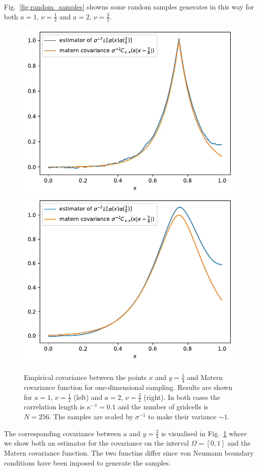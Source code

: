 \documentclass[11pt]{article}
\begin{document}
Fig.~\ref{fig:random_samples} showns some random samples generates in this way for both $a=1$, $\nu=\frac{1}{2}$ and $a=2$, $\nu=\frac{3}{2}$.
\begin{figure}
    \begin{center}
        \includegraphics[width=0.45\linewidth]{figures/covariance_nu0_5.pdf}
        \hfill
        \includegraphics[width=0.45\linewidth]{figures/covariance_nu1_5.pdf}
    \end{center}
    \caption{Empirical covariance between the points $x$ and $y=\frac{3}{4}$ and Matern covariance function for one-dimensional sampling. Results are shown for $a=1$, $\nu=\frac{1}{2}$ (left) and $a=2$, $\nu=\frac{3}{2}$ (right). In both cases the correlation length is $\kappa^{-1}=0.1$ and the number of gridcells is $N=256$. The samples are scaled by $\sigma^{-1}$ to make their variance $\sim 1$.}
    \label{fig:lognormal_covariance}
\end{figure}
The corresponding covariance between $a$ and $y=\frac{3}{4}$ is visualised in Fig.~\ref{fig:lognormal_covariance} where we show both an estimator for the covariance on the interval $\Omega=[0,1]$ and the Matern covariance function. The two functins differ since von Neumann boundary conditions have been imposed to generate the samples.
\end{document}
